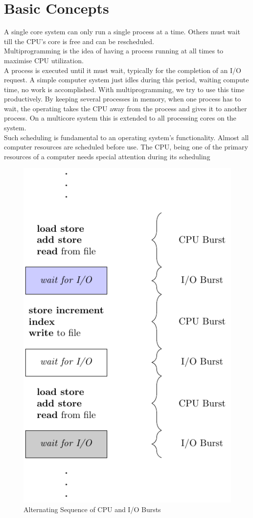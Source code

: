 \documentclass[oneside]{book}
\begin{document}
        \section{Basic Concepts}
            A single core system can only run a single process at a time. Others must wait
            till the CPU's core is free and can be rescheduled.\\
            Multiprogramming is the idea of having a process running at all times to maximise
            CPU utilization.\\
            A process is executed until it must wait, typically for the completion of an I/O 
            request. A simple computer system just idles during this period, waiting compute time,
            no work is accomplished. With multiprogramming, we try to use this time productively.
            By keeping several processes in memory, when one process has to wait, the operating takes 
            the CPU away from the process and gives it to another process. On a multicore system this
            is extended to all processing cores on the system.\\
            Such scheduling is fundamental to an operating system's functionality. Almost all 
            computer resources are scheduled before use. The CPU, being one of the primary resources
            of a computer needs special attention during its scheduling
            \begin{figure}[H]
                \centering
                \includegraphics[width=0.2\linewidth]{figures/cpu_io_burst.pdf}
                \caption{Alternating Sequence of CPU and I/O Bursts}
            \end{figure}
\end{document}
